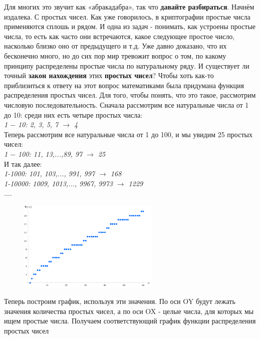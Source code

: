 \hspace{20}Для многих это звучит как «абракадабра», так что \textbf{давайте разбираться}. Начнём издалека. С простых чисел. Как уже говорилось, в криптографии простые числа применяются сплошь и рядом. И одна из задач - понимать, как устроены простые числа, то есть как часто они встречаются, какое следующее простое число, насколько близко оно от предыдущего и т.д. Уже давно доказано, что их бесконечно много, но до сих пор мир тревожит вопрос о том, по какому принципу распределены простые числа по натуральному ряду. И существует ли точный \textbf{закон нахождения} этих \textbf{простых чисел}? Чтобы хоть как-то приблизиться к ответу на этот вопрос математиками была придумана функция распределения простых чисел. Для того, чтобы понять, что это такое, рассмотрим числовую последовательность. Сначала рассмотрим все натуральные числа от 1 до 10: среди них есть четыре простых числа:\\
\textit{1 $-$ 10: 2, 3, 5, 7 $\rightarrow$ 4}\\
Теперь рассмотрим все натуральные числа от 1 до 100, и мы увидим 25 простых чисел:\\
\textit{1 $-$ 100: 11, 13,...,89, 97 $\rightarrow$ 25}\\
И так далее:\\
\textit{1-1000: 101, 103,..., 991, 997 $\rightarrow$ 168}\\
\textit{1-10000: 1009, 1013,..., 9967, 9973 $\rightarrow$ 1229}\\
....
\newline \hspace{20}
\begin{figure}
 \vspace{-40pt}
  \begin{center}
    \includegraphics[width=0.6\textwidth]{prime.png}
  \end{center}
   \vspace{-10pt}
\end{figure}
\hspace{20}
Теперь построим график, используя эти значения. По оси OY будут лежать значения количества простых чисел, а по оси OX - целые числа, для которых мы ищем простые числа. Получаем соответствующий график функции распределения простых чисел



